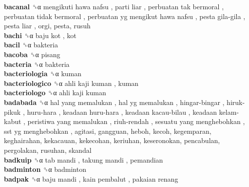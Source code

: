 \textbf{bacanal} ␝α   mengikuti hawa nafsu ,  parti liar ,  perbuatan tak bermoral ,  perbuatan tidak bermoral ,  perbuatan yg mengikut hawa nafsu ,  pesta gila-gila ,  pesta liar , orgi, pesta, rusuh  \\
\textbf{bachi} ␝α   baju kot , kot  \\
\textbf{bacil} ␝α  bakteria  \\
\textbf{bacoba} ␝α  pisang  \\
\textbf{bacteria} ␝α  bakteria  \\
\textbf{bacteriologia} ␝α  kuman  \\
\textbf{bacteriologico} ␝α   ahli kaji kuman , kuman  \\
\textbf{bacteriologo} ␝α   ahli kaji kuman   \\
\textbf{badabada} ␝α   hal yang memalukan ,  hal yg memalukan ,  hingar-bingar ,  hiruk-pikuk ,  huru-hara ,  keadaan huru-hara ,  keadaan kacau-bilau ,  keadaan kelam-kabut ,  peristiwa yang memalukan ,  riuh-rendah ,  sesuatu yang menghebohkan ,  sst yg menghebohkan , agitasi, gangguan, heboh, kecoh, kegemparan, keghairahan, kekacauan, kekecohan, keriuhan, keseronokan, pencabulan, pergolakan, rusuhan, skandal  \\
\textbf{badkuip} ␝α   tab mandi ,  takung mandi , pemandian  \\
\textbf{badminton} ␝α  badminton  \\
\textbf{badpak} ␝α   baju mandi ,  kain pembalut ,  pakaian renang   \\
